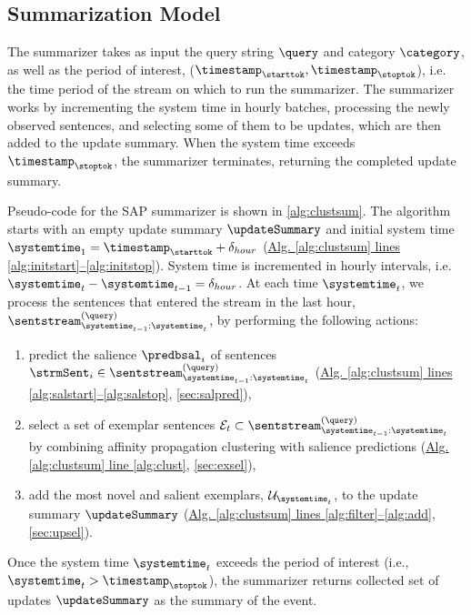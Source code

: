 \subsection{Summarization Model}
\label{sec:methods}




The summarizer takes as input the query string $\query$ and category
$\category$, as well as the period of interest, ($\timestamp_\starttok,
\timestamp_\stoptok$), i.e.  the time period of the stream on which to run the
summarizer. The summarizer works by incrementing the system time in hourly
batches, processing the newly observed sentences, and selecting some of them
to be updates, which are then added to the update summary. When the system
time exceeds $\timestamp_\stoptok$, the summarizer terminates, returning the
completed update summary.



 Pseudo-code for the SAP summarizer is shown in \autoref{alg:clustsum}.  The
algorithm starts with an empty update summary $\updateSummary$ and initial
system time $\systemtime_1 = \timestamp_\starttok + \delta_{hour}$
(\hyperref[alg:clustsum]{Alg. \ref{alg:clustsum} lines
\ref{alg:initstart}--\ref{alg:initstop}}).  System time is incremented in
hourly intervals, i.e. $\systemtime_{t} - \systemtime_{t-1} = \delta_{hour}$.
At each time $\systemtime_t$, we process the sentences that entered the stream
in the last hour,
$\sentstream^{(\query)}_{\systemtime_{t-1}:\systemtime_{t}}$, by performing
the following actions:
\begin{enumerate}
    \item predict the salience $\predbsal_i$ of sentences $\strmSent_i \in
\sentstream^{(\query)}_{\systemtime_{t-1}:\systemtime_{t}}$
(\hyperref[alg:clustsum]{Alg. \ref{alg:clustsum} lines
\ref{alg:salstart}--\ref{alg:salstop}}, \autoref{sec:salpred}),
    \item select a set of exemplar sentences $\mathcal{E}_t \subset
\sentstream^{(\query)}_{\systemtime_{t-1}:\systemtime_{t}}$ by combining
affinity propagation clustering with salience predictions
(\hyperref[alg:clustsum]{Alg. \ref{alg:clustsum} line \ref{alg:clust}},
\autoref{sec:exsel}),
    \item add the most novel and salient exemplars,
$\mathcal{U}_{\systemtime_t}$, to the update summary $\updateSummary$
(\hyperref[alg:clustsum]{Alg. \ref{alg:clustsum} lines
\ref{alg:filter}--\ref{alg:add}}, \autoref{sec:upsel}).
\end{enumerate}
Once the system time $\systemtime_t$ exceeds the period of interest (i.e.,
$\systemtime_t > \timestamp_\stoptok$), the summarizer returns collected set
of updates $\updateSummary$ as the summary of the event.
